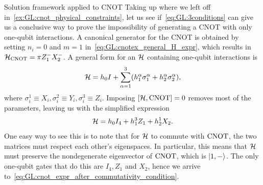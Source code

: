 \begin{examplebox}[label={ex:GL:cnot_with_conditions}]{Solution framework applied to CNOT}
\fontsize{10pt}{10pt}\selectfont
Taking up where we left off in~\cref{ex:GL:cnot_physical_constraints}, let us see if~\cref{eq:GL:3conditions} can give us a conclusive way to prove the impossibility of generating a CNOT with only one-qubit interactions.
A canonical generator for the CNOT is obtained by setting $n_i=0$ and $m=1$ in~\cref{eq:GL:cnotex_general_H_expr}, which results in
${\mathcal{H}}_{\operatorname{CNOT}}=\pi Z_1^- X_2^-$.
A general form for an ${\mathcal{H}}$ containing one-qubit interactions is
\begin{equation}
    {\mathcal{H}} = h_0 I +
    \sum_{\alpha=1}^3 (h_1^\alpha\sigma_1^\alpha + h_2^\alpha\sigma_2^\alpha),
\end{equation}
where $\sigma_i^1\equiv X_i, \sigma_i^2\equiv Y_i, \sigma_i^3\equiv Z_i$.
Imposing $[{\mathcal{H}},\operatorname{CNOT}]=0$ removes most of the parameters, leaving us with the simplified expression
\begin{equation}
    {\mathcal{H}} = h_0 I_4 + h_1^3 Z_1 + h_2^1 X_2.
    \label{eq:GL:cnot_expr_after_commutativity_condition}
\end{equation}
One easy way to see this is to note that for ${\mathcal{H}}$ to commute with $\operatorname{CNOT}$, the two matrices must respect each other's eigenspaces. In particular, this means that ${\mathcal{H}}$ must preserve the nondegenerate eigenvector of $\operatorname{CNOT}$, which is $\ket{1,-}$.
The only one-qubit gates that do this are $I_4, Z_1$ and $X_2$, hence we arrive to~\cref{eq:GL:cnot_expr_after_commutativity_condition}.


\end{examplebox}
